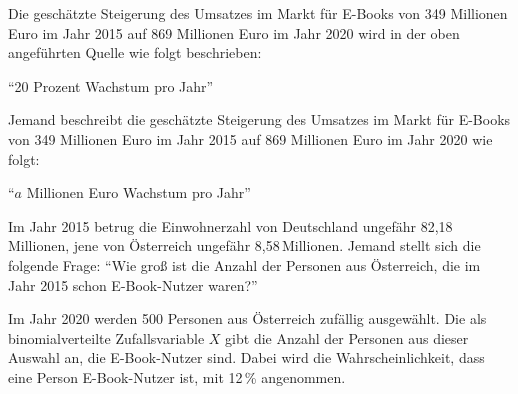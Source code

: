 \begin{langesbeispiel}
\begin{aufgabenstellung}

\item Die geschätzte Steigerung des Umsatzes im Markt für E-Books von 349 Millionen Euro im Jahr 2015 auf 869 Millionen Euro im Jahr 2020 wird in der oben angeführten Quelle wie folgt beschrieben:
	
	"`20 Prozent Wachstum pro Jahr"'%

	
Jemand beschreibt die geschätzte Steigerung des Umsatzes im Markt für E-Books von 349 Millionen Euro im Jahr 2015 auf 869 Millionen Euro im Jahr 2020 wie folgt:
	
	"`$a$ Millionen Euro Wachstum pro Jahr"'	
	

\item Im Jahr 2015 betrug die Einwohnerzahl von Deutschland ungefähr 82,18\,Millionen, jene von Österreich ungefähr 8,58\,Millionen. Jemand stellt sich die folgende Frage: "`Wie groß ist die Anzahl der Personen aus Österreich, die im Jahr 2015 schon E-Book-Nutzer waren?"'%


Im Jahr 2020 werden 500 Personen aus Österreich zufällig ausgewählt. Die als binomialverteilte Zufallsvariable $X$ gibt die Anzahl der Personen aus dieser Auswahl an, die E-Book-Nutzer sind. Dabei wird die Wahrscheinlichkeit, dass eine Person E-Book-Nutzer ist, mit 12\,\% angenommen.	
	

\end{aufgabenstellung}
\end{langesbeispiel}
